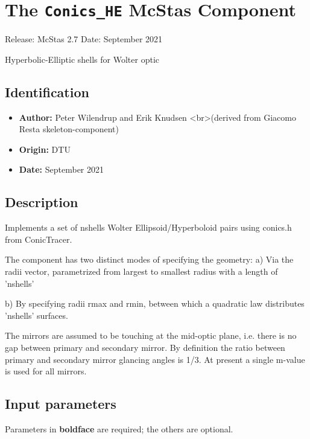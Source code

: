 \section{The \texttt{Conics\_HE} McStas Component}
Release: McStas 2.7
Date: September 2021

Hyperbolic-Elliptic shells for Wolter optic

\subsection*{Identification}
\begin{itemize}
  \item \textbf{Author:} Peter Wilendrup and Erik Knudsen \textless{}br\textgreater{}(derived from Giacomo Resta skeleton-component)
  \item \textbf{Origin:} DTU
  \item \textbf{Date:} September 2021
\end{itemize}

\subsection*{Description}
Implements a set of nshells Wolter Ellipsoid/Hyperboloid pairs using conics.h from ConicTracer.

The component has two distinct modes of specifying the geometry: a) Via the radii vector, parametrized from largest to smallest radius with a length of 'nshells'

b) By specifying radii rmax and rmin, between which a quadratic law distributes 'nshells' surfaces.

The mirrors are assumed to be touching at the mid-optic plane, i.e. there is no gap between primary and secondary mirror. By definition the ratio between primary and secondary mirror glancing angles is 1/3. At present a single m-value is used for all mirrors.

\subsection*{Input parameters}
Parameters in \textbf{boldface} are required; the others are optional.

